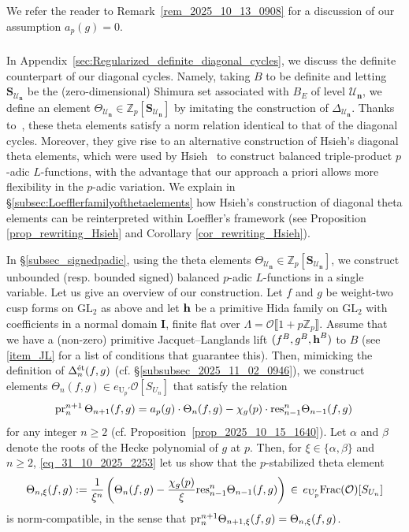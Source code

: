 \documentclass{amsart}
\numberwithin{equation}{section}
\newcommand{\Zp}{\mathbb{Z}_p}
\newcommand{\cO}{\mathcal{O}}
\newcommand{\GL}{\mathrm{GL}}
\newcommand{\h}{\textup{\bf h}}
\newcommand{\res}{\textup{res}}
\newcommand{\etale}{\textup{\'et}}
\newcommand{\BI}{\mathbf{I}}
\begin{document}
We refer the reader to Remark~\ref{rem_2025_10_13_0908} for a discussion of our assumption $a_p(g)=0$. 

\subsubsection{} 
\label{subsubsec_2025_10_31_1451}
In Appendix~\ref{sec:Regularized_definite_diagonal_cycles}, we discuss the definite counterpart of our diagonal cycles. Namely, taking $B$ to be definite and letting $\mathbf{S}_{\mathcal{U}_{\mathbf{n}}}$ be the (zero-dimensional) Shimura set associated with $B_E$ of level $\mathcal{U}_{\mathbf{n}}$, we define an element $\Theta_{\mathcal{U}_{\mathbf{n}}}\in  \Zp[\mathbf{S}_{\mathcal{U}_{\mathbf{n}}}]$ by imitating the construction of $\Delta_{\mathcal{U}_{\mathbf{n}}}$. Thanks to~\cite{LoefflerSpherical}, these theta elements satisfy a norm relation identical to that of the diagonal cycles. Moreover, they give rise to an alternative construction of Hsieh's diagonal theta elements, which were used by Hsieh~\cite{hsiehpadicbalanced} to construct balanced triple-product $p$-adic $L$-functions, with the advantage that our approach a priori allows more flexibility in the $p$-adic variation. We explain in \S\ref{subsec:Loefflerfamilyofthetaelements} how Hsieh’s construction of diagonal theta elements can be reinterpreted within Loeffler’s framework (see Proposition \ref{prop_rewriting_Hsieh} and Corollary \ref{cor_rewriting_Hsieh}). 



In \S\ref{subsec_signedpadic}, using the theta elements $\Theta_{\mathcal{U}_{\mathbf{n}}}\in  \Zp[\mathbf{S}_{\mathcal{U}_{\mathbf{n}}}]$, we
construct unbounded (resp. bounded signed) balanced $p$-adic $L$-functions in a single variable. Let us give an overview of our construction. Let $f$ and $g$ be weight-two cusp forms on $\GL_2$ as above and let $\h$ be a primitive Hida family on $\GL_2$  with coefficients in a normal domain $\BI$, finite flat over $\Lambda = \cO\llbracket1+p\Zp\rrbracket$. Assume that we have a (non-zero) primitive Jacquet--Langlands lift $(f^B,g^B,\h^B)$ to $B$ (see \eqref{item_JL} for a list of conditions that guarantee this). Then, mimicking the definition of ${\Delta}_{n}^{\etale}(f,g)$ (cf. \S\ref{subsubsec_2025_11_02_0946}), we construct elements $\Theta_{n}(f,g) \in e_{\mathrm{U}_{p}'}\mathcal{O}[S_{U_{n}}]$ that satisfy the relation
    \begin{align}\label{eq_31_10_2025_2253}
        {\rm pr}_{n}^{n+1}\,\Theta_{n+1}(f,g)=a_p(g)\cdot\Theta_{n}(f,g)-\chi_g(p)\cdot \res_{n-1}^{n}\Theta_{n-1}(f,g)\,
    \end{align}
 for any integer $n \geq 2$ (cf. Proposition~\ref{prop_2025_10_15_1640}).   
Let $\alpha$ and $\beta$ denote the roots of the Hecke polynomial of $g$ at $p$. Then,  for $\xi \in \{ \alpha, \beta\}$ and $n \geq 2$, \eqref{eq_31_10_2025_2253} let us show that the $p$-stabilized theta element $$\Theta_{n,\xi}(f,g):=\frac{1}{\xi^{n}}\left(\Theta_{n}(f,g)-\frac{\chi_g(p)}{\xi}\res_{n-1}^{n} \Theta_{n-1}(f,g)\right) \,\in\, e_{\mathrm{U}_{p}'}{\rm Frac}(\mathcal{O})[S_{U_n}]$$
is norm-compatible, in the sense that ${\rm pr}_{n}^{n+1} \Theta_{n+1,\xi}(f,g) = \Theta_{n,\xi}(f,g)$. 
\end{document}
